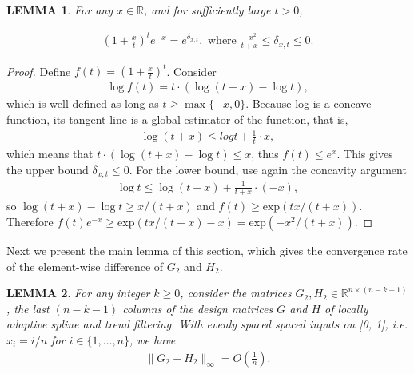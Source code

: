 \documentclass[a4paper]{article}
\newtheorem{lemma}{LEMMA}
\newcommand{\RR}{\mathbb{R}}
\begin{document}
\begin{lemma}
For any $x\in\RR$, and for sufficiently large $t >0$,

\begin{align*}
(1+\frac{x}{t})^te^{-x} = e^{\delta_{x,t}}, \text{ where } \frac{-x^2}{t+x} \leq \delta_{x,t} \leq 0.
\end{align*}
\label{lemma:expbound}
\end{lemma}
\begin{proof}
Define $f(t) = (1+\frac{x}{t})^t$. Consider 
\begin{align*}
\log f(t) = t\cdot (\log(t+x) - \log t),
\end{align*}
which is well-defined as long as $t\geq \max\{-x, 0\}$. Because log is a concave function, its tangent line is a global estimator of the function, that is,
\begin{align*}
\log(t+x) \leq log t + \frac{1}{t}\cdot x,
\end{align*}
which means that $t\cdot (\log(t+x) - \log t)\leq x$, thus $f(t) \leq e^x$. This gives the upper bound $\delta_{x,t}\leq 0$. For the lower bound, use again the concavity argument
\begin{align*}
\log t\leq \log(t+x) + \frac{1}{t+x}\cdot(-x),
\end{align*}
so $\log(t+x) - \log t \geq x/(t+x)$ and $f(t) \geq \mbox{exp}(tx/(t+x))$. Therefore $f(t)e^{-x}\geq \mbox{exp}(tx/(t+x) - x) = \mbox{exp}(-x^2/(t+x))$.
\end{proof}

Next we present the main lemma of this section, which gives the convergence rate of the element-wise difference of $G_2$ and $H_2$.

\begin{lemma}
For any integer $k\geq 0$, consider the matrices $G_2, H_2\in\RR^{n\times (n-k-1)}$, the last $(n-k-1)$ columns of the design matrices $G$ and $H$ of locally adaptive spline and trend filtering. With evenly spaced spaced inputs on [0, 1], i.e. $x_i = i/n$ for $i\in\{1,\ldots, n\}$, we have
\begin{align*}
\|G_2-H_2\|_\infty = O(\frac{1}{n}).
\end{align*}
\label{lemma:diff_order}
\end{lemma}
\end{document}
